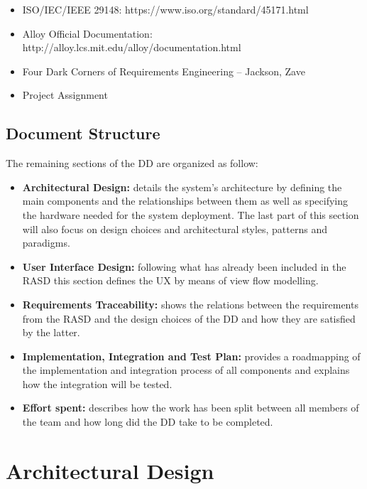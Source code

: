 \documentclass[titlepage]{article}
\begin{document}
\begin{itemize}
   	\item ISO/IEC/IEEE 29148: https://www.iso.org/standard/45171.html 
	\item Alloy Official Documentation: \\
	http://alloy.lcs.mit.edu/alloy/documentation.html 
   	\item Four Dark Corners of Requirements Engineering – Jackson, Zave 
	\item Project Assignment 
\end{itemize}


\subsection{Document Structure}
The remaining sections of the DD are organized as follow:
    \begin{itemize}
        \item {\bf Architectural Design: }details the system’s architecture by defining the main components and the relationships between them as well as specifying the hardware needed for the system deployment. The last part of this section will also focus on design choices and architectural styles, patterns and paradigms.
		\item {\bf User Interface Design:  }following what has already been included in the RASD this section defines the UX by means of view flow modelling.
		\item {\bf Requirements Traceability: }shows the relations between the requirements from the RASD and the design choices of the DD and how they are satisfied by the latter.
		\item {\bf Implementation, Integration and Test Plan: }provides a roadmapping of the implementation and integration process of all components and explains how the integration will be tested.
		\item {\bf Effort spent: }describes how the work has been split between all members of the team and how long did the DD take to be completed.
    \end{itemize}
\pagebreak



\section{Architectural Design}
\end{document}
